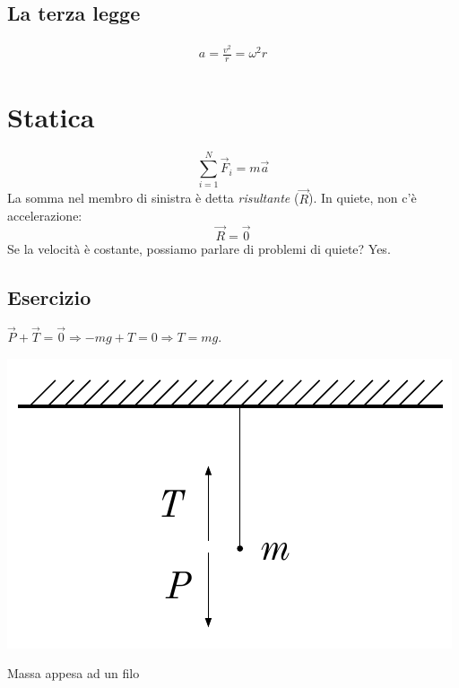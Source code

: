 \subsection{La terza legge}
\vspace{8pt}
\begin{tcolorbox}[colback = red!30, colframe = red!30!black, title = {Terza legge della dinamica}]

\end{tcolorbox}
\vspace{5pt}



\vspace{8pt}
\begin{tcolorbox}[colback = red!30, colframe = red!30!black, title = {Accelerazione centripeta nel moto circolare uniforme}]
\begin{align}
    a = \frac{v^2}{r} = \omega^2 r
\end{align}
\end{tcolorbox}
\vspace{5pt}


\section{Statica}
\[ \sum_{i = 1}^{N}\overrightarrow{F}_i = m\overrightarrow{a} \]
La somma nel membro di sinistra è detta \textit{risultante} ($\overrightarrow{R}$).
In quiete, non c'è accelerazione:
\[ \overrightarrow{R} = \overrightarrow{0} \]
Se la velocità è costante, possiamo parlare di problemi di quiete? Yes.

\subsection*{Esercizio}
$\overrightarrow{P} + \overrightarrow{T} = \overrightarrow{0} \Rightarrow -mg + T = 0 \Rightarrow T = mg$.

\begin{marginfigure}
    \centering
    \includegraphics[width = \marginparwidth]{figures/statica.pdf}
    \caption{Massa appesa ad un filo}
    \label{filo}
\end{marginfigure}


